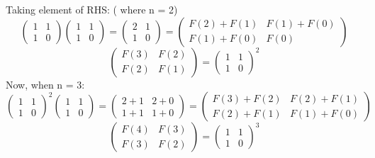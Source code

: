 \documentclass[11pt, a4paper]{article}
\begin{document}
Taking element of RHS: ( where n = 2)
\[ \begin{pmatrix}
          1 & 1 \\
          1 & 0
        \end{pmatrix} 
        \begin{pmatrix}
          1 & 1 \\
          1 & 0
        \end{pmatrix} =
        \begin{pmatrix}
          2 & 1 \\
          1 & 0
        \end{pmatrix} =
        \begin{pmatrix}
          F(2) + F(1) & F(1) + F(0) \\
          F(1) + F(0) & F(0) 
      \end{pmatrix} \]
        \[ \begin{pmatrix}
            F(3) & F(2) \\
            F(2) & F(1)
        \end{pmatrix} =
        \begin{pmatrix}
            1 & 1 \\
            1 & 0
        \end{pmatrix} ^2
      \]
 Now, when n = 3:
\[ \begin{pmatrix}
          1 & 1 \\
          1 & 0
        \end{pmatrix}^2 
        \begin{pmatrix}
          1 & 1 \\
          1 & 0
        \end{pmatrix} =
        \begin{pmatrix}
          2 + 1 & 2 + 0 \\
          1 + 1 & 1 + 0
        \end{pmatrix} =
        \begin{pmatrix}
          F(3) + F(2) & F(2) + F(1) \\
          F(2) + F(1) & F(1) + F(0) 
      \end{pmatrix} \]
        \[ \begin{pmatrix}
            F(4) & F(3) \\
            F(3) & F(2)
        \end{pmatrix} =
        \begin{pmatrix}
            1 & 1 \\
            1 & 0
        \end{pmatrix} ^3
      \]
\end{document}

